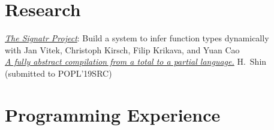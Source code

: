 \documentclass[margin,line]{resume}
\begin{document}
\begin{resume}
    

    
    
    

    \section{\mysidestyle Research}
    \textit{\href{https://github.com/PRL-PRG/signatr}{The Signatr Project}}: Build a system to infer function types dynamically\\
          {\footnotesize with Jan Vitek, Christoph Kirsch, Filip Krikava, and Yuan Cao}\\[\mymedskip]
    \textit{\href{https://github.com/hyeyoungshin/popl19src/blob/master/popl19src.pdf}{A fully abstract compilation from
        a total to a partial language.}} H.~Shin (submitted to {\small POPL}'19SRC)\\ %

    \section{\mysidestyle Programming Experience} 


\end{resume}
\end{document}
